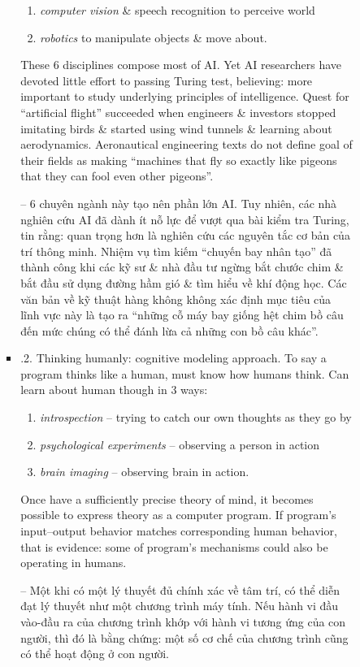 \documentclass{article}
\begin{document}
\begin{itemize}
\begin{itemize}
\begin{itemize}
\begin{itemize}
\begin{enumerate}
					\item {\it computer vision} \& speech recognition to perceive world
					\item {\it robotics} to manipulate objects \& move about.
				\end{enumerate}
				These 6 disciplines compose most of AI. Yet AI researchers have devoted little effort to passing Turing test, believing: more important to study underlying principles of intelligence. Quest for ``artificial flight'' succeeded when engineers \& investors stopped imitating birds \& started using wind tunnels \& learning about aerodynamics. Aeronautical engineering texts do not define goal of their fields as making ``machines that fly so exactly like pigeons that they can fool even other pigeons''.
				
				-- 6 chuyên ngành này tạo nên phần lớn AI. Tuy nhiên, các nhà nghiên cứu AI đã dành ít nỗ lực để vượt qua bài kiểm tra Turing, tin rằng: quan trọng hơn là nghiên cứu các nguyên tắc cơ bản của trí thông minh. Nhiệm vụ tìm kiếm ``chuyến bay nhân tạo'' đã thành công khi các kỹ sư \& nhà đầu tư ngừng bắt chước chim \& bắt đầu sử dụng đường hầm gió \& tìm hiểu về khí động học. Các văn bản về kỹ thuật hàng không không xác định mục tiêu của lĩnh vực này là tạo ra ``những cỗ máy bay giống hệt chim bồ câu đến mức chúng có thể đánh lừa cả những con bồ câu khác''.
				\item {.2. Thinking humanly: cognitive modeling approach.} To say a program thinks like a human, must know how humans think. Can learn about human though in 3 ways:
				\begin{enumerate}
					\item {\it introspection} -- trying to catch our own thoughts as they go by
					\item {\it psychological experiments} -- observing a person in action
					\item {\it brain imaging} -- observing brain in action.
				\end{enumerate}
				Once have a sufficiently precise theory of mind, it becomes possible to express theory as a computer program. If program's input--output behavior matches corresponding human behavior, that is evidence: some of program's mechanisms could also be operating in humans.
				
				-- Một khi có một lý thuyết đủ chính xác về tâm trí, có thể diễn đạt lý thuyết như một chương trình máy tính. Nếu hành vi đầu vào-đầu ra của chương trình khớp với hành vi tương ứng của con người, thì đó là bằng chứng: một số cơ chế của chương trình cũng có thể hoạt động ở con người.
				

\end{itemize}
\end{itemize}
\end{itemize}
\end{itemize}
\end{document}
